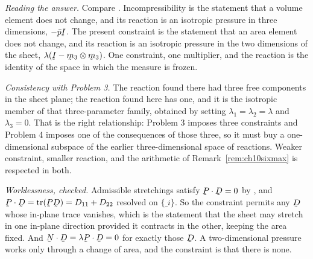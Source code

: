 \begin{solution}
\emph{Reading the answer.} Compare . Incompressibility is the
statement that a volume element does not change, and its reaction is an
isotropic pressure in three dimensions, $-\bar p\I$. The present
constraint is the statement that an area element does not change, and its
reaction is an isotropic pressure in the two dimensions of the sheet,
$\lambda(\I-\bm_{3}\otimes\bm_{3})$. One constraint, one multiplier, and
the reaction is the identity of the space in which the measure is
frozen.

\emph{Consistency with Problem 3.} The reaction found there had three
free components in the sheet plane; the reaction found here has one, and
it is the isotropic member of that three-parameter family, obtained by
setting $\lambda_{1}=\lambda_{2}=\lambda$ and $\lambda_{3}=0$. That is
the right relationship: Problem 3 imposes three constraints and Problem 4
imposes one of the consequences of those three, so it must buy a
one-dimensional subspace of the earlier three-dimensional space of
reactions. Weaker constraint, smaller reaction, and the arithmetic of
Remark~\ref{rem:ch10sixmax} is respected in both.

\emph{Worklessness, checked.} Admissible stretchings satisfy
$\bP\cdot\bD=0$ by , and $\bP\cdot\bD
=\tr(\bP\bD)=D_{11}+D_{22}$ resolved on $\{\bm_{i}\}$. So the constraint
permits any $\bD$ whose in-plane trace vanishes, which is the statement
that the sheet may stretch in one in-plane direction provided it
contracts in the other, keeping the area fixed. And
$\bN\cdot\bD=\lambda\bP\cdot\bD=0$ for exactly those $\bD$. A
two-dimensional pressure works only through a change of area, and the
constraint is that there is none.
\end{solution}
